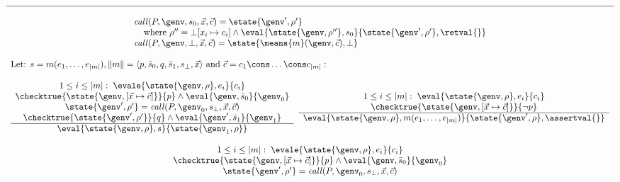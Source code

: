 \begin{figure}[tbp]
\begin{displaymath}
\begin{array}{c}
\hline
\ \\
\begin{array}{l}
\mathit{call}(P,\genv,s_0,\vec{x},\vec{c})  =  \state{\genv',\rho'} \\
\;\;\;\;\mbox{where } \rho'' = \bot[x_i \mapsto c_i] \wedge 
      \eval{\state{\genv,\rho''},s_0}{\state{\genv',\rho'},\retval{}} \\
\mathit{call}(P,\genv,\bot,\vec{x},\vec{c}) =  \state{\means{m}(\genv,\vec{c}),\bot}
\end{array} \\
\ \\
\multicolumn{1}{l}{%
\mbox{Let: }s = m(e_1,\ldots,e_{|m|}), \|m\| = \langle p,\bar{s}_0,q,\bar{s}_1, s_\bot,\vec{x} \rangle \mbox{ and } \vec{c} = c_1 \cons \ldots \cons c_{|m|}:} \\
\ \\
\begin{array}{c}
1 \leq i \leq |m|:\;\evale{\state{\genv,\rho},e_i}{c_i} \\
\checktrue{\state{\genv,[\vec{x} \mapsto \vec{c}]}}{p} \wedge
\eval{\genv,\bar{s}_0}{\genv_0} \\
\state{\genv',\rho'} = \mathit{call}(P,\genv_0,s_\bot,\vec{x},\vec{c}) \\
\checktrue{\state{\genv',\rho'}}{q} \wedge 
\eval{\genv',\bar{s}_1}{\genv_1}   \\
\hline
\eval{\state{\genv,\rho},s}{\state{\genv_1,\rho}}
\end{array} 
\;\;
\begin{array}{c}
1 \leq i \leq |m|:\;\eval{\state{\genv,\rho},e_i}{c_i} \\
\checktrue{\state{\genv,[\vec{x} \mapsto \vec{c}]}}{\neg p} \\
\hline
\eval{\state{\genv,\rho},m(e_1,\ldots,e_{|m|})}{\state{\genv',\rho},\assertval{}}
\end{array} \\
\ \\
\begin{array}{c}
1 \leq i \leq |m|:\;\evale{\state{\genv,\rho},e_i}{c_i} \\
\checktrue{\state{\genv,[\vec{x} \mapsto \vec{c}]}}{p} \wedge
\eval{\genv,\bar{s}_0}{\genv_0} \\
\state{\genv',\rho'} = \mathit{call}(P,\genv_0,s_\bot,\vec{x},\vec{c}) \\

\end{array}
\end{array}
\end{displaymath}
\end{figure}
